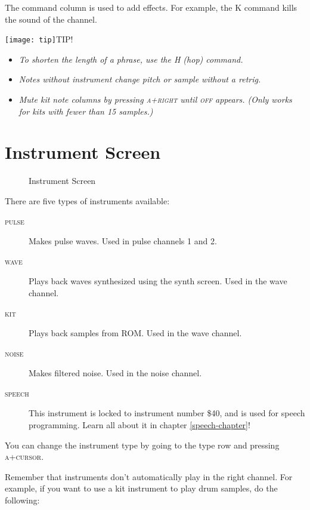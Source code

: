 The command column is used to add effects. For example, the K command kills the sound of the channel.

\texttt{[image: tip]}TIP!
\begin{itemize}
    \item \textit{To shorten the length of a phrase, use the H (hop) command.}
    \item \textit{Notes without instrument change pitch or sample without a retrig.}
    \item \textit{Mute kit note columns by pressing \textsc{a+right} until \textsc{off} appears. (Only works for kits with fewer than 15 samples.)}
\end{itemize}

\section{Instrument Screen}

\begin{figure}[hbtp]
\centering
{}
\caption{Instrument Screen}
\label{fig:instr2}
\end{figure}

There are five types of instruments available:

\begin{description}
\item[\textsc{pulse}] Makes pulse waves. Used in pulse channels 1 and 2.
\item[\textsc{wave}] Plays back waves synthesized using the synth screen. Used in the wave channel.
\item[\textsc{kit}] Plays back samples from ROM. Used in the wave channel.
\item[\textsc{noise}] Makes filtered noise. Used in the noise channel.
\item[\textsc{speech}] This instrument is locked to instrument number \$40, and is used for speech programming. Learn all about it in chapter \ref{speech-chapter}!
\end{description}

You can change the instrument type by going to the type row and pressing \textsc{a+cursor}.

Remember that instruments don't automatically play in the right channel. For example, if you want to use a kit instrument to play drum samples, do the following:

